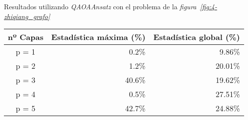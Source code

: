 \begin{table}[htbp]{}{Resultados utilizando \textit{QAOAAnsatz} con el problema de la \textit{figura~\ref{fig:4-zhiqiang_grafo}}}
  \centering
  \begin{tabular}{|c|r|r|}
    \hline
    \textbf{nº Capas} & \textbf{Estadística máxima (\%)} & \textbf{Estadística global (\%)} \\ \hline
    p = 1 &  0.2\% &  9.86\% \\ \hline
    p = 2 &  1.2\% & 20.01\% \\ \hline
    p = 3 & 40.6\% & 19.62\% \\ \hline
    p = 4 &  0.5\% & 27.51\% \\ \hline
    p = 5 & 42.7\% & 24.88\% \\ \hline
  \end{tabular}
\end{table}


